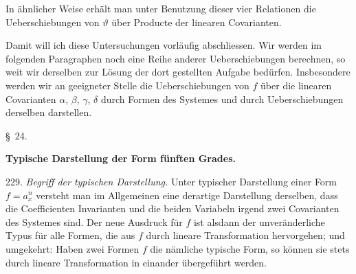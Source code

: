 




In ähnlicher Weise erhält man unter Benutzung dieser vier Relationen
die Ueberschiebungen von $\vartheta$ über Producte der linearen Covarianten.

Damit will ich diese Untersuchungen vorläufig abschliessen. Wir
werden im folgenden Paragraphen noch eine Reihe anderer Ueberschiebungen
berechnen, so weit wir derselben zur Lösung der dort
gestellten Aufgabe bedürfen. Insbesondere werden wir an geeigneter
Stelle die Ueberschiebungen von $f$ über die linearen Covarianten $\alpha$, $\beta$,
$\gamma$, $\delta$ durch Formen des Systemes und durch Ueberschiebungen derselben
darstellen.

\begin{center}
\S~24.

\textbf{Typische Darstellung der Form fünften Grades.}
\end{center}

229. \textit{Begriff der typischen Darstellung.} Unter typischer Darstellung
einer Form $f = a_x^n$ versteht man im Allgemeinen eine derartige
Darstellung derselben, dass die Coefficienten Invarianten und
die beiden Variabeln irgend zwei Covarianten des Systemes sind. Der
neue Ausdruck für $f$ ist alsdann der unveränderliche Typus für alle
Formen, die aus $f$ durch lineare Transformation hervorgehen; und umgekehrt:
Haben zwei Formen $f$ die nämliche typische Form, so können
sie stets durch lineare Transformation in einander übergeführt werden.

